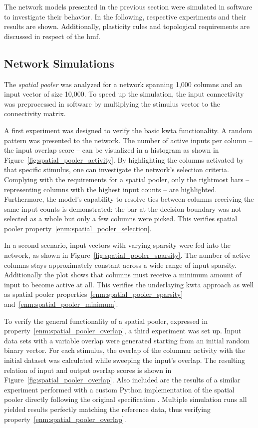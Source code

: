 The network models presented in the previous section were simulated in software to investigate their behavior. In the following, respective experiments and their results are shown. Additionally, plasticity rules and topological requirements are discussed in respect of the \gls{hmf}.

\subsection{Network Simulations}


The \emph{spatial pooler} was analyzed for a network spanning 1,000 columns and an input vector of size 10,000. To speed up the simulation, the input connectivity was preprocessed in software by multiplying the stimulus vector to the connectivity matrix.

A first experiment was designed to verify the basic \gls{kwta} functionality. A
random pattern was presented to the network. The number of active inputs per
column -- the input overlap score -- can be visualized in a histogram as shown
in Figure~\ref{fig:spatial_pooler_activity}. By highlighting the columns
activated by that specific stimulus, one can investigate the network's selection
criteria. Complying with the requirements for a spatial pooler, only the
rightmost bars -- representing columns with the highest input counts -- are
highlighted. Furthermore, the model's capability to resolve ties between columns
receiving the same input counts is demonstrated: the bar at the decision
boundary was not selected as a whole but only a few columns were picked. This
verifies spatial pooler property~\ref{enm:spatial_pooler_selection}.

In a second scenario, input vectors with varying sparsity were fed into the
network, as shown in Figure~\ref{fig:spatial_pooler_sparsity}. The number of
active columns stays approximately constant across a wide range of input
sparsity. Additionally the plot shows that columns must receive a minimum amount
of input to become active at all. This verifies the underlaying \gls{kwta}
approach as well as spatial pooler properties~\ref{enm:spatial_pooler_sparsity}
and~\ref{enm:spatial_pooler_minimum}.

To verify the general functionality of a spatial pooler,  expressed in
property~\ref{enm:spatial_pooler_overlap}, a third experiment was set up. Input
data sets with a variable overlap were generated starting from an initial random
binary vector. For each stimulus, the overlap of the columnar activity with the
initial dataset was calculated while sweeping the input's overlap. The resulting
relation of input and output overlap scores is shown in
Figure~\ref{fig:spatial_pooler_overlap}. Also included are the results of a
similar experiment performed with a custom Python implementation of the spatial
pooler directly following the original specification \citep{numenta2011htm}.
Multiple simulation runs all yielded results perfectly matching the reference
data, thus verifying property~\ref{enm:spatial_pooler_overlap}.

